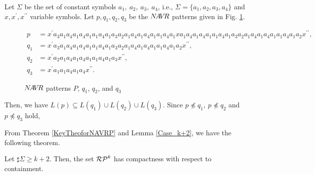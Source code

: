 \begin{ex}\label{Case_k+1}\label{反例k+1}
Let $\Sigma$ be the set of constant symbols $a_{1},~a_{2},~a_{3},~a_{4}$, i.e., $\Sigma= \{a_{1}, a_{2}, a_{3}, a_{4} \}$ and $x,x^{\prime},x^{\prime\prime}$ variable symbols.
Let $p,q_{1},q_{2},q_{3}$ be the $N\!A\!V\!R$ patterns given in Fig. \ref{Fig:CounterExampleforNAVR}. 
\begin{figure*}[tb]
\begin{align*}
p & = x^{\prime}a_{3}a_{1}a_{4}a_{1}a_{4}a_{1}a_{1}a_{4}a_{1}a_{3}a_{2}a_{1}a_{4}a_{1}a_{4}a_{1}a_{1}a_{4}a_{1}xa_{1}a_{4}a_{1}a_{4}a_{1}a_{1}a_{4}a_{1}a_{3}a_{2}a_{1}a_{4}a_{1}a_{4}a_{1}a_{1}a_{4}a_{1}a_{2}x^{\prime\prime},\\
q_{1} & = x^{\prime}a_{3}a_{1}a_{4}a_{1}a_{4}a_{1}a_{1}a_{4}a_{1}a_{3}a_{2}a_{1}a_{4}a_{1}a_{4}a_{1}a_{1}a_{4}a_{1}a_{2}x^{\prime\prime},\\
q_{2} & = x^{\prime}a_{2}a_{1}a_{4}a_{1}a_{4}a_{1}a_{1}a_{4}a_{1}a_{3}x^{\prime\prime},\\
q_{3} & = x^{\prime}a_{1}a_{1}a_{4}a_{1}a_{4}x^{\prime\prime}.
\end{align*}
\caption{$N\!A\!V\!R$ patterns $P$, $q_{1}$, $q_{2}$, and $q_{3}$}\label{Fig:CounterExampleforNAVR}
\end{figure*}
\noindent
Then, we have $L(p) \subseteq L(q_{1}) \cup L(q_{2}) \cup L(q_{3})$.
Since $p \not \preceq q_{1},~p \not \preceq q_{2}$ and $p \not \preceq q_{3}$ hold,


\end{ex}

From Theorem \ref{KeyTheoforNAVRP} and Lemma \ref{Case_k+2}, we have the following theorem.

\begin{thm}\label{MainTheforNAVRP}
Let $\sharp\Sigma \ge k+2$.
Then, the set $\mathcal{RP}^{k}$ has compactness with respect to containment.
\end{thm}